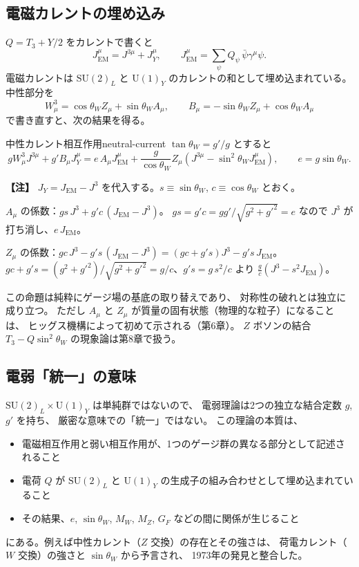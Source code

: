 \documentclass[uplatex,dvipdfmx,a4paper,11pt,openany]{jsbook}
\newenvironment{note}{\vspace{1ex}\par\footnotesize\noindent\textbf{【注】}}{\par\vspace{1ex}}
\numberwithin{equation}{chapter}
\theoremstyle{definition}
\theoremstyle{plain}
\theoremstyle{remark}
\newcommand{\SU}{\mathrm{SU}}
\newcommand{\U}{\mathrm{U}}
\begin{document}
\subsection{電磁カレントの埋め込み}
$Q=T_3+Y/2$ をカレントで書くと
\begin{equation}
J^\mu_{\mathrm{EM}}=J^{3\mu}+J^\mu_Y,
\qquad
J^\mu_{\mathrm{EM}}=\sum_\psi Q_\psi\,\bar\psi\gamma^\mu\psi .
\end{equation}
電磁カレントは $\SU(2)_L$ と $\U(1)_Y$ のカレントの和として埋め込まれている。
中性部分を
\begin{equation}
W^3_\mu=\cos\theta_WZ_\mu+\sin\theta_WA_\mu,
\qquad
B_\mu=-\sin\theta_WZ_\mu+\cos\theta_WA_\mu
\end{equation}
で書き直すと、次の結果を得る。
\begin{myprop}{中性カレント相互作用}{neutral-current}
$\tan\theta_W=g'/g$ とすると
\begin{equation}
gW^3_\mu J^{3\mu}+g'B_\mu J^\mu_Y
=e\,A_\mu J^\mu_{\mathrm{EM}}
+\frac{g}{\cos\theta_W}Z_\mu\left(J^{3\mu}-\sin^2\theta_W J^\mu_{\mathrm{EM}}\right),
\qquad
e=g\sin\theta_W .
\end{equation}
\end{myprop}
\begin{note}
$J_Y=J_{\mathrm{EM}}-J^3$ を代入する。$s\equiv\sin\theta_W$, $c\equiv\cos\theta_W$ とおく。

$A_\mu$ の係数：$gs\,J^3+g'c\,(J_{\mathrm{EM}}-J^3)$。
$gs=g'c=gg'/\sqrt{g^2+g'^2}=e$ なので $J^3$ が打ち消し、$e\,J_{\mathrm{EM}}$。

$Z_\mu$ の係数：$gc\,J^3-g's\,(J_{\mathrm{EM}}-J^3)=(gc+g's)J^3-g's\,J_{\mathrm{EM}}$。
$gc+g's=(g^2+g'^2)/\sqrt{g^2+g'^2}=g/c$、$g's=g\,s^2/c$ より
$\frac gc\left(J^3-s^2J_{\mathrm{EM}}\right)$。
\end{note}
この命題は純粋にゲージ場の基底の取り替えであり、
対称性の破れとは独立に成り立つ。
ただし $A_\mu$ と $Z_\mu$ が質量の固有状態（物理的な粒子）になることは、
ヒッグス機構によって初めて示される（第6章）。
$Z$ ボソンの結合 $T_3-Q\sin^2\theta_W$ の現象論は第8章で扱う。
\subsection{電弱「統一」の意味}
$\SU(2)_L\times\U(1)_Y$ は単純群ではないので、
電弱理論は2つの独立な結合定数 $g$, $g'$ を持ち、
厳密な意味での「統一」ではない。
この理論の本質は、
\begin{itemize}
    \item 電磁相互作用と弱い相互作用が、1つのゲージ群の異なる部分として記述されること
    \item 電荷 $Q$ が $\SU(2)_L$ と $\U(1)_Y$ の生成子の組み合わせとして埋め込まれていること
    \item その結果、$e$, $\sin\theta_W$, $M_W$, $M_Z$, $G_F$ などの間に関係が生じること
\end{itemize}
にある。例えば中性カレント（$Z$ 交換）の存在とその強さは、
荷電カレント（$W$ 交換）の強さと $\sin\theta_W$ から予言され、
1973年の発見と整合した。
\end{document}
